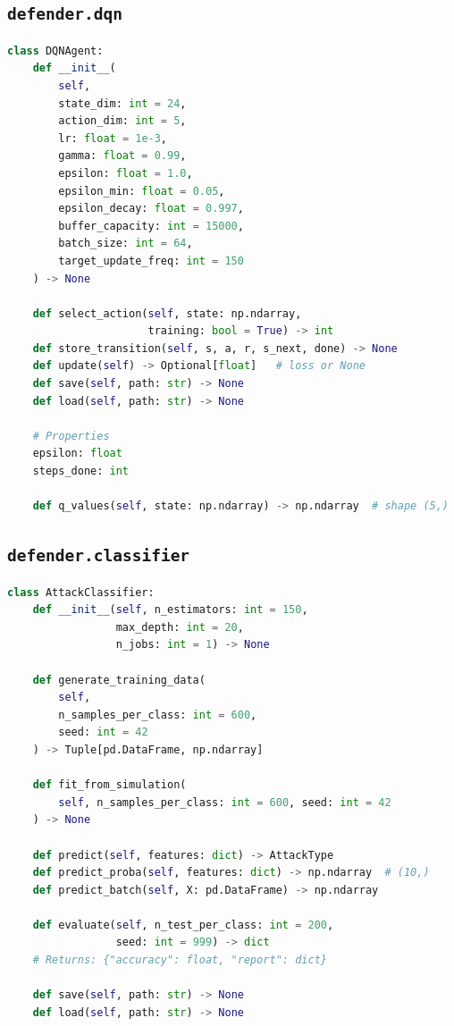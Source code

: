 \subsection{\texttt{defender.dqn}}

\begin{lstlisting}[language=Python, caption={DQN agent interface (unchanged; retained for comparison, Sections 3.5, 5.2--5.3).}]
class DQNAgent:
    def __init__(
        self,
        state_dim: int = 24,
        action_dim: int = 5,
        lr: float = 1e-3,
        gamma: float = 0.99,
        epsilon: float = 1.0,
        epsilon_min: float = 0.05,
        epsilon_decay: float = 0.997,
        buffer_capacity: int = 15000,
        batch_size: int = 64,
        target_update_freq: int = 150
    ) -> None

    def select_action(self, state: np.ndarray,
                      training: bool = True) -> int
    def store_transition(self, s, a, r, s_next, done) -> None
    def update(self) -> Optional[float]   # loss or None
    def save(self, path: str) -> None
    def load(self, path: str) -> None

    # Properties
    epsilon: float
    steps_done: int

    def q_values(self, state: np.ndarray) -> np.ndarray  # shape (5,)
\end{lstlisting}

\subsection{\texttt{defender.classifier}}

\begin{lstlisting}[language=Python, caption={Random Forest attack classifier interface (unchanged; training-data generation now benefits from the Section 3.2.4 independent-sample override).}]
class AttackClassifier:
    def __init__(self, n_estimators: int = 150,
                 max_depth: int = 20,
                 n_jobs: int = 1) -> None

    def generate_training_data(
        self,
        n_samples_per_class: int = 600,
        seed: int = 42
    ) -> Tuple[pd.DataFrame, np.ndarray]

    def fit_from_simulation(
        self, n_samples_per_class: int = 600, seed: int = 42
    ) -> None

    def predict(self, features: dict) -> AttackType
    def predict_proba(self, features: dict) -> np.ndarray  # (10,)
    def predict_batch(self, X: pd.DataFrame) -> np.ndarray

    def evaluate(self, n_test_per_class: int = 200,
                 seed: int = 999) -> dict
    # Returns: {"accuracy": float, "report": dict}

    def save(self, path: str) -> None
    def load(self, path: str) -> None
\end{lstlisting}

